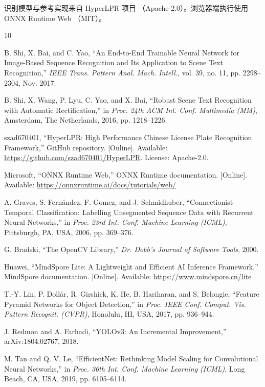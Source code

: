 \documentclass[UTF8,a4paper,11pt]{ctexart}
\begin{document}
识别模型与参考实现来自 HyperLPR 项目 \cite{hyperlpr}（Apache-2.0）。浏览器端执行使用
ONNX Runtime Web \cite{ortweb}（MIT）。

\begin{thebibliography}{10}

B. Shi, X. Bai, and C. Yao, ``An End-to-End Trainable Neural Network for
Image-Based Sequence Recognition and Its Application to Scene Text Recognition,''
\emph{IEEE Trans. Pattern Anal. Mach. Intell.}, vol. 39, no. 11,
pp. 2298--2304, Nov. 2017.

B. Shi, X. Wang, P. Lyu, C. Yao, and X. Bai, ``Robust Scene Text Recognition
with Automatic Rectification,'' in \emph{Proc. 24th ACM Int. Conf. Multimedia
(MM)}, Amsterdam, The Netherlands, 2016, pp. 1218--1226.

szad670401, ``HyperLPR: High Performance Chinese License Plate Recognition
Framework,'' GitHub repository. [Online]. Available:
\url{https://github.com/szad670401/HyperLPR}. License: Apache-2.0.

Microsoft, ``ONNX Runtime Web,'' ONNX Runtime documentation. [Online]. Available:
\url{https://onnxruntime.ai/docs/tutorials/web/}

A. Graves, S. Fern\'andez, F. Gomez, and J. Schmidhuber, ``Connectionist Temporal
Classification: Labelling Unsegmented Sequence Data with Recurrent Neural
Networks,'' in \emph{Proc. 23rd Int. Conf. Machine Learning (ICML)}, Pittsburgh,
PA, USA, 2006, pp. 369--376.

G. Bradski, ``The OpenCV Library,'' \emph{Dr. Dobb's Journal of Software Tools},
2000.

Huawei, ``MindSpore Lite: A Lightweight and Efficient AI Inference Framework,''
MindSpore documentation. [Online]. Available:
\url{https://www.mindspore.cn/lite}

T.-Y. Lin, P. Doll\'ar, R. Girshick, K. He, B. Hariharan, and S. Belongie,
``Feature Pyramid Networks for Object Detection,'' in \emph{Proc. IEEE Conf.
Comput. Vis. Pattern Recognit. (CVPR)}, Honolulu, HI, USA, 2017, pp. 936--944.

J. Redmon and A. Farhadi, ``YOLOv3: An Incremental Improvement,''
arXiv:1804.02767, 2018.

M. Tan and Q. V. Le, ``EfficientNet: Rethinking Model Scaling for Convolutional
Neural Networks,'' in \emph{Proc. 36th Int. Conf. Machine Learning (ICML)}, Long
Beach, CA, USA, 2019, pp. 6105--6114.

\end{thebibliography}
\end{document}
